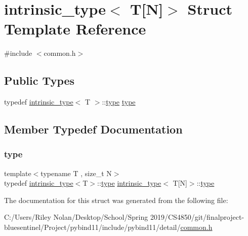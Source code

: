 \hypertarget{structintrinsic__type_3_01_t[_n]_4}{}\section{intrinsic\+\_\+type$<$ T\mbox{[}N\mbox{]}$>$ Struct Template Reference}
\label{structintrinsic__type_3_01_t[_n]_4}


{\ttfamily \#include $<$common.\+h$>$}

\subsection*{Public Types}
\begin{DoxyCompactItemize}
\item 
typedef \mbox{\hyperlink{structintrinsic__type}{intrinsic\+\_\+type}}$<$ T $>$\+::\mbox{\hyperlink{structintrinsic__type_3_01_t[_n]_4_a1293e367b8af022bba0150ff1b991c7b}{type}} \mbox{\hyperlink{structintrinsic__type_3_01_t[_n]_4_a1293e367b8af022bba0150ff1b991c7b}{type}}
\end{DoxyCompactItemize}


\subsection{Member Typedef Documentation}
\mbox{\label{structintrinsic__type_3_01_t[_n]_4_a1293e367b8af022bba0150ff1b991c7b}} 
\subsubsection{\texorpdfstring{type}{type}}
{\footnotesize\ttfamily template$<$typename T , size\+\_\+t N$>$ \\
typedef \mbox{\hyperlink{structintrinsic__type}{intrinsic\+\_\+type}}$<$T$>$\+::\mbox{\hyperlink{structintrinsic__type_3_01_t[_n]_4_a1293e367b8af022bba0150ff1b991c7b}{type}} \mbox{\hyperlink{structintrinsic__type}{intrinsic\+\_\+type}}$<$ T\mbox{[}N\mbox{]}$>$\+::\mbox{\hyperlink{structintrinsic__type_3_01_t[_n]_4_a1293e367b8af022bba0150ff1b991c7b}{type}}}



The documentation for this struct was generated from the following file\+:\begin{DoxyCompactItemize}
\item 
C\+:/\+Users/\+Riley Nolan/\+Desktop/\+School/\+Spring 2019/\+C\+S4850/git/finalproject-\/bluesentinel/\+Project/pybind11/include/pybind11/detail/\mbox{\hyperlink{detail_2common_8h}{common.\+h}}\end{DoxyCompactItemize}
